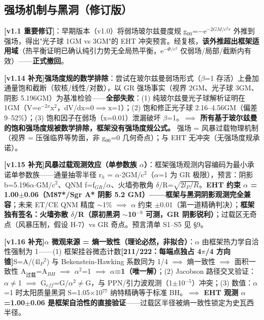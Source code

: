 \documentclass[UTF8,fontset=windows]{csoarticle}
\newcommand{\mtag}[1]{\textbf{[#1]}}
\newcommand{\up}[1]{\ensuremath{^{#1}}}
\newcommand{\down}[1]{\ensuremath{_{#1}}}
\begin{document}
\subsection{强场机制与黑洞（修订版）}

\textbf{\mtag{v1.1 重要修订}}：早期版本（v1.0）将弱场玻尔兹曼度规 g\down{00}=\ensuremath{-}e\up{-2GM/c^{2}r} 外推到强场，得出"光子球 1GM vs 3GM"的 EHT 冲突预言。经复核，\textbf{该外推超出框架适用域}（热平衡证明已确认纯引力势无全局热平衡，e\up{-\Phi{}/c^{2}} 仅弱场/局部/截断内有效）------\textbf{正式撤回}。

\textbf{\mtag{v1.14 补充}强场度规的数学排除}：尝试在玻尔兹曼弱场形式（\ensuremath{\beta}=1 存活）上叠加通量饱和截断（软核/线性/对数），以 GR 强场事实（视界 2GM、光子球 3GM、阴影 5.196GM）为基准检验------\textbf{全部失败}：(1) 纯玻尔兹曼光子球解析证明在 1GM（V=e\up{-2x}x\up{2}，dV/dx=0\ensuremath{\implies}x=1）；(2) 饱和修正光子球 2.16--4.56GM（偏差 9--52\%）；(3) 饱和因子在弱场（x=0.01）泄漏破坏 \ensuremath{\beta}=1。\textbf{\ensuremath{\implies} 所有基于玻尔兹曼的饱和强场度规被数学排除，框架没有强场度规公式。} 强场 = 风暴过载物理机制（视界 = 压强临界等势面，非 g\down{00}=0 几何奇点）；与 EHT 无冲突（无强场度规承诺）。

\textbf{\mtag{v1.15 补充}风暴过载观测效应（单参数族 \ensuremath{\alpha}）}：框架强场观测内容编码为最小承诺单参数族------通量抽零半径 r\down{h} = \ensuremath{\alpha}\ensuremath{\cdot}2GM/c\up{2}（\ensuremath{\alpha}=1 为 GR 极限），预言：阴影 b=5.196\ensuremath{\alpha}\ensuremath{\cdot}GM/c\up{2}、QNM f=f\down{GR}/\ensuremath{\alpha}、火墙弥散角 \ensuremath{\delta}/R=\ensuremath{\sqrt{2l\down{P}/R}}。\textbf{EHT 约束 \ensuremath{\alpha} = 1.00\ensuremath{\pm}0.06（M87*/Sgr A* 阴影 5.2 GM）------框架与黑洞阴影观测完全兼容}；未来 ET/CE QNM 精度 \ensuremath{\sim}1\% \ensuremath{\implies} \ensuremath{\alpha} 约束 \ensuremath{\pm}0.01（第一道精确判决）；\textbf{框架独有签名：火墙弥散 \ensuremath{\delta}/R（原初黑洞 \ensuremath{\sim}10\up{-9} 可测，GR 阴影锐利）}；过载区无奇点（风暴压制，假设 H-7）vs GR 奇点。预言清单 S1--S5 见 \S{}9。

\textbf{\mtag{v1.16 补充}\ensuremath{\alpha} 微观来源 = 熵一致性（理论必然，非拟合）}：\ensuremath{\alpha} 由框架热力学自洽性强制为 1------(1) 框架挂谷微态计数\mtag{211/222：每端点独占 4\ensuremath{\pi}/4 方向锥}S=A/(4l\down{P}\up{2}) 与 Bekenstein-Hawking 系数同为 1/4 \ensuremath{\implies} 熵一致性 \ensuremath{\implies} 面积一致性 A\down{过载}=A\down{BH} \ensuremath{\implies} \ensuremath{\alpha}\up{2}=1 \ensuremath{\implies} \textbf{\ensuremath{\alpha}=1（唯一解）}；(2) Jacobson 路径交叉验证：\ensuremath{\alpha}\ensuremath{\neq}1 \ensuremath{\implies} G\down{eff}=G/\ensuremath{\alpha}\up{2}\ensuremath{\neq}G，与 PPN/引力波观测（1\ensuremath{\pm}10\up{-5}）冲突；(3) 数值：\ensuremath{\alpha}=1 时太阳质量黑洞 S=1.05\ensuremath{\times}10\up{77} 纳特精确等于标准 BH。\textbf{\ensuremath{\implies} EHT 观测 \ensuremath{\alpha}=1.00\ensuremath{\pm}0.06 是框架自洽性的直接验证}------过载区半径被熵一致性锁定为史瓦西半径。
\end{document}
